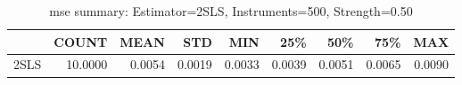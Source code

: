 \begin{table}[ht]
\centering
\caption{mse summary: Estimator=2SLS, Instruments=500, Strength=0.50}
\begin{tabular}{lrrrrrrrr}
\toprule
 & COUNT & MEAN & STD & MIN & 25\% & 50\% & 75\% & MAX \\
\midrule
2SLS & 10.0000 & 0.0054 & 0.0019 & 0.0033 & 0.0039 & 0.0051 & 0.0065 & 0.0090 \\
\bottomrule
\end{tabular}
\end{table}
